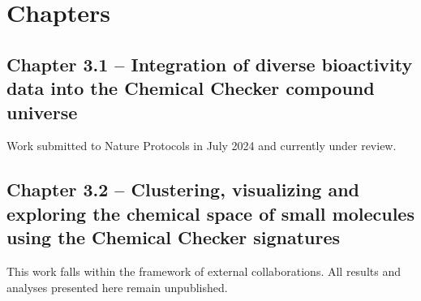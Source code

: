 
\chapter{Chapters}
\newpage
\thispagestyle{plain}
\mbox{}
\newpage



\section[Integration of diverse bioactivity data into the Chemical Checker compound universe]{Chapter 3.1 -- Integration of diverse bioactivity data into the Chemical Checker compound universe}
\label{Chapter_3.1}
\setcounter{figure}{0}
\renewcommand{\thefigure}{3.\arabic{section}.\arabic{figure}}
Work submitted to Nature Protocols in July 2024 and currently under review.







\newpage

\thispagestyle{plain}
\mbox{}
\newpage


\section[Clustering, visualizing and exploring the chemical space of small molecules using the Chemical Checker signatures]{Chapter 3.2 -- Clustering, visualizing and exploring the chemical space of small molecules using the Chemical Checker signatures}
\label{Chapter_3.2}
\setcounter{figure}{0}
\renewcommand{\thefigure}{3.\arabic{section}.\arabic{figure}}
This work falls within the framework of external collaborations. All results and analyses presented here remain unpublished. 

